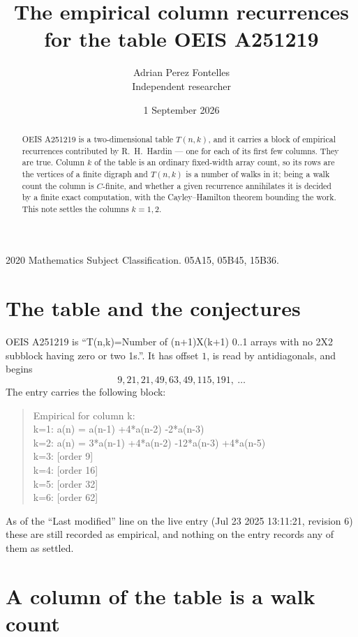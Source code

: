 \documentclass[11pt,a4paper]{article}
\title{The empirical column recurrences for the table OEIS A251219}
\author{Adrian Perez Fontelles\\ \small Independent researcher}
\date{1 September 2026}
\theoremstyle{plain}
\theoremstyle{definition}
\begin{document}
\maketitle

\begin{abstract}
OEIS A251219 is a two-dimensional table $T(n,k)$, and it carries a block of empirical
recurrences contributed by R.~H.~Hardin --- one for each of its first few columns. They are
true. Column $k$ of the table is an ordinary fixed-width array count, so its rows are the
vertices of a finite digraph and $T(n,k)$ is a number of walks in it; being a walk count the
column is $C$-finite, and whether a given recurrence annihilates it is decided by a finite
exact computation, with the Cayley--Hamilton theorem bounding the work. This note settles the columns $k=1, 2$.
\end{abstract}

\noindent\small 2020 Mathematics Subject Classification. 05A15, 05B45, 15B36.\normalsize

\section{The table and the conjectures}

OEIS A251219 is ``T(n,k)=Number of (n+1)X(k+1) 0..1 arrays with no 2X2 subblock having zero or two 1s.''. It has offset $1$, is
read by antidiagonals, and begins
\[
9, 21, 21, 49, 63, 49, 115, 191,\ \dots
\]
The entry carries the following block:
\begin{quote}\small
Empirical for column k:\\
k=1: a(n) = a(n-1) +4*a(n-2) -2*a(n-3)\\
k=2: a(n) = 3*a(n-1) +4*a(n-2) -12*a(n-3) +4*a(n-5)\\
k=3: [order 9]\\
k=4: [order 16]\\
k=5: [order 32]\\
k=6: [order 62]\\
\end{quote}
As of the ``Last modified'' line on the live entry (Jul 23 2025 13:11:21, revision 6) these are still
recorded as empirical, and nothing on the entry records any of them as settled.

\section{A column of the table is a walk count}
\end{document}
